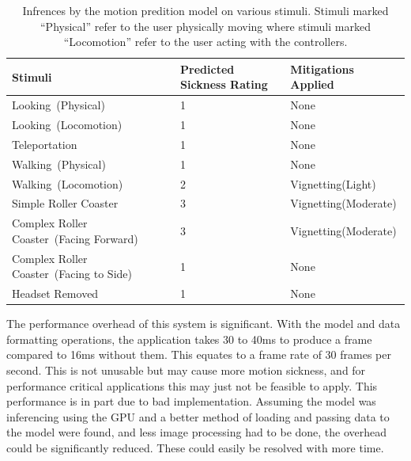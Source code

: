 \begin{table}[h!]
    \centering
    \begin{tabular}{|l|l|l|}
        \hline
        Stimuli                                & Predicted Sickness Rating & Mitigations Applied  \\ \hline
        Looking~(Physical)                      & 1                         & None                 \\ \hline
        Looking~(Locomotion)                    & 1                         & None                 \\ \hline
        Teleportation                          & 1                         & None                 \\ \hline
        Walking~(Physical)                      & 1                         & None                 \\ \hline
        Walking~(Locomotion)                    & 2                         & Vignetting(Light)    \\ \hline
        Simple Roller Coaster                  & 3                         & Vignetting(Moderate) \\ \hline
        Complex Roller Coaster~(Facing Forward) & 3                         & Vignetting(Moderate) \\ \hline
        Complex Roller Coaster~(Facing to Side) & 1                         & None                 \\ \hline
        Headset Removed                        & 1                         & None                 \\ \hline
    \end{tabular}
    \caption{Infrences by the motion predition model on various stimuli. Stimuli marked ``Physical'' refer to the user physically moving where stimuli marked ``Locomotion'' refer to the user acting with the controllers.}
    \label{tab:predictions}
\end{table}

The performance overhead of this system is significant.
With the model and data formatting operations, the application takes 30 to 40ms to produce a frame compared to 16ms without them.
This equates to a frame rate of 30 frames per second.
This is not unusable but may cause more motion sickness, and for performance critical applications this may just not be feasible to apply.
This performance is in part due to bad implementation.
Assuming the model was inferencing using the GPU and a better method of loading and passing data to the model were found, and less image processing had to be done, the overhead could be significantly reduced.
These could easily be resolved with more time.

